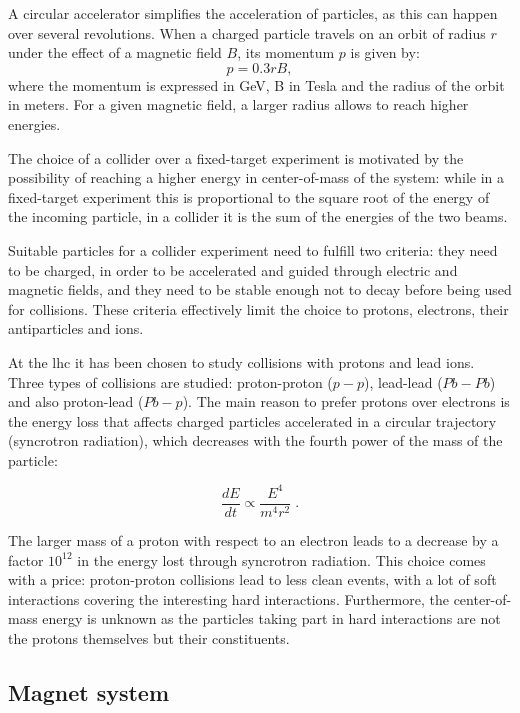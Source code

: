 A circular accelerator simplifies the acceleration of particles, as this can happen over several revolutions. When a charged particle travels on an orbit of radius $r$ under the effect of a magnetic field $B$, its momentum $p$ is given by:
\begin{equation}
\label{eq:cern:p03br}
p = 0.3 r B,
\end{equation}
\noindent where the momentum is expressed in GeV, B in Tesla and the radius of the orbit in meters. For a given magnetic field, a larger radius allows to reach higher energies. 

The choice of a collider over a fixed-target experiment is motivated by the possibility of reaching a higher energy in center-of-mass of the system: while in a fixed-target experiment this is proportional to the square root of the energy of the incoming particle, in a collider it is the sum of the energies of the two beams.


Suitable particles for a collider experiment need to fulfill two criteria: they need to be charged, in order to be accelerated and guided through electric and magnetic fields, and they need to be stable enough not to decay before being used for collisions. These criteria effectively limit the choice to protons, electrons, their antiparticles and ions. 

At the \gls{lhc} it has been chosen to study collisions with protons and lead ions. Three types of collisions are studied: proton-proton ($p-p$), lead-lead ($Pb-Pb$) and also proton-lead ($Pb-p$). The main reason to prefer protons over electrons is the energy loss that affects charged particles accelerated in a circular trajectory (syncrotron radiation), which decreases with the fourth power of the mass of the particle:

\begin{equation}
\label{eq:cern:sync}
\frac{dE}{dt} \propto \frac{E^4}{m^4 r^2} \; .
\end{equation}

The larger mass of a proton with respect to an electron leads to a decrease by a factor $10^{12}$ in the energy lost through syncrotron radiation. This choice comes with a price: proton-proton collisions lead to less clean events, with a lot of soft interactions covering the interesting hard interactions. Furthermore, the center-of-mass energy is unknown as the particles taking part in hard interactions are not the protons themselves but their constituents.

\subsection{Magnet system} 


